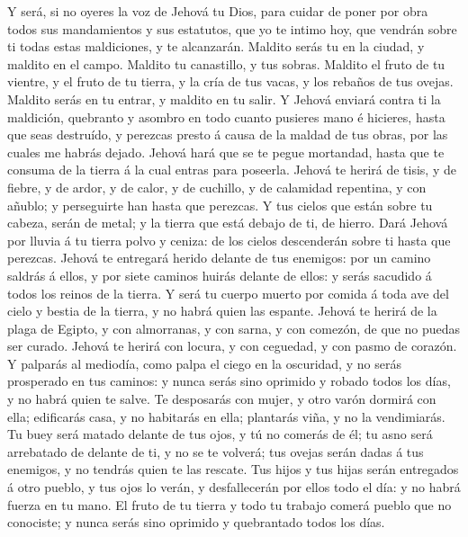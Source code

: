  Y será, si no oyeres la voz de Jehová tu Dios, para cuidar
de poner por obra todos sus mandamientos y sus estatutos, que yo te
intimo hoy, que vendrán sobre ti todas estas maldiciones, y te
alcanzarán.  Maldito serás tu en la ciudad, y maldito en el
campo.  Maldito tu canastillo, y tus sobras. 
Maldito el fruto de tu vientre, y el fruto de tu tierra, y la cría de
tus vacas, y los rebaños de tus ovejas.  Maldito serás en
tu entrar, y maldito en tu salir.  Y Jehová enviará contra
ti la maldición, quebranto y asombro en todo cuanto pusieres mano é
hicieres, hasta que seas destruído, y perezcas presto á causa de la
maldad de tus obras, por las cuales me habrás dejado. 
Jehová hará que se te pegue mortandad, hasta que te consuma de la tierra
á la cual entras para poseerla.  Jehová te herirá de tisis,
y de fiebre, y de ardor, y de calor, y de cuchillo, y de calamidad
repentina, y con añublo; y perseguirte han hasta que perezcas.
 Y tus cielos que están sobre tu cabeza, serán de metal; y
la tierra que está debajo de ti, de hierro.  Dará Jehová
por lluvia á tu tierra polvo y ceniza: de los cielos descenderán sobre
ti hasta que perezcas.  Jehová te entregará herido delante
de tus enemigos: por un camino saldrás á ellos, y por siete caminos
huirás delante de ellos: y serás sacudido á todos los reinos de la
tierra.  Y será tu cuerpo muerto por comida á toda ave del
cielo y bestia de la tierra, y no habrá quien las espante. 
Jehová te herirá de la plaga de Egipto, y con almorranas, y con sarna, y
con comezón, de que no puedas ser curado.  Jehová te herirá
con locura, y con ceguedad, y con pasmo de corazón.  Y
palparás al mediodía, como palpa el ciego en la oscuridad, y no serás
prosperado en tus caminos: y nunca serás sino oprimido y robado todos
los días, y no habrá quien te salve.  Te desposarás con
mujer, y otro varón dormirá con ella; edificarás casa, y no habitarás en
ella; plantarás viña, y no la vendimiarás.  Tu buey será
matado delante de tus ojos, y tú no comerás de él; tu asno será
arrebatado de delante de ti, y no se te volverá; tus ovejas serán dadas
á tus enemigos, y no tendrás quien te las rescate.  Tus
hijos y tus hijas serán entregados á otro pueblo, y tus ojos lo verán, y
desfallecerán por ellos todo el día: y no habrá fuerza en tu mano.
 El fruto de tu tierra y todo tu trabajo comerá pueblo que
no conociste; y nunca serás sino oprimido y quebrantado todos los días.
